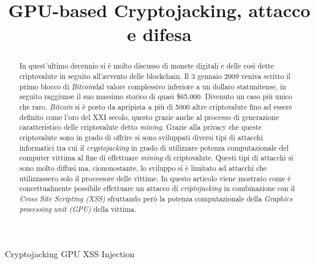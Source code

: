\documentclass[conference, italian]{IEEEtran}
\begin{document}
\title{GPU-based Cryptojacking, attacco e difesa
}

\author{
\and
{}
}

\maketitle

\begin{abstract}
In quest'ultimo decennio si è molto discusso di monete digitali e delle così dette criptovalute in seguito all'avvento delle blockchain. Il 3 gennaio 2009 veniva scritto il primo blocco di \emph{Bitcoin}dal valore complessivo inferiore a un dollaro statunitense, in seguito raggiunse il suo massimo storico di quasi \$65.000. Divenuto un caso più unico che raro, \emph{Bitcoin} si è posto da apripista a più di 5000 altre criptovalute fino ad essere definito come l'oro del \RN{21} secolo, questo grazie anche al processo di generazione caratteristico delle criptovalute detto \emph{mining}. Grazie alla privacy che queste criptovalute sono in grado di offrire si sono sviluppati diversi tipi di attacchi informatici tra cui il \emph{cryptojacking} in grado di utilizzare potenza computazionale del computer vittima al fine di effettuare \emph{mining} di criptovalute. Questi tipi di attacchi si sono molto diffusi ma, ciononostante, lo sviluppo si è limitato ad attacchi che utilizzassero solo il processore delle vittime. In questo articolo viene mostrato come è concettualmente possibile effettuare un attacco di \emph{criptojacking} in combinazione con il \emph{Cross Site Scripting (XSS)} sfruttando però la potenza computazionale della \emph{Graphics processing unit (GPU)} della vittima.\\
\end{abstract}

\begin{IEEEkeywords}
Cryptojacking GPU XSS Injection
\end{IEEEkeywords}
\end{document}
